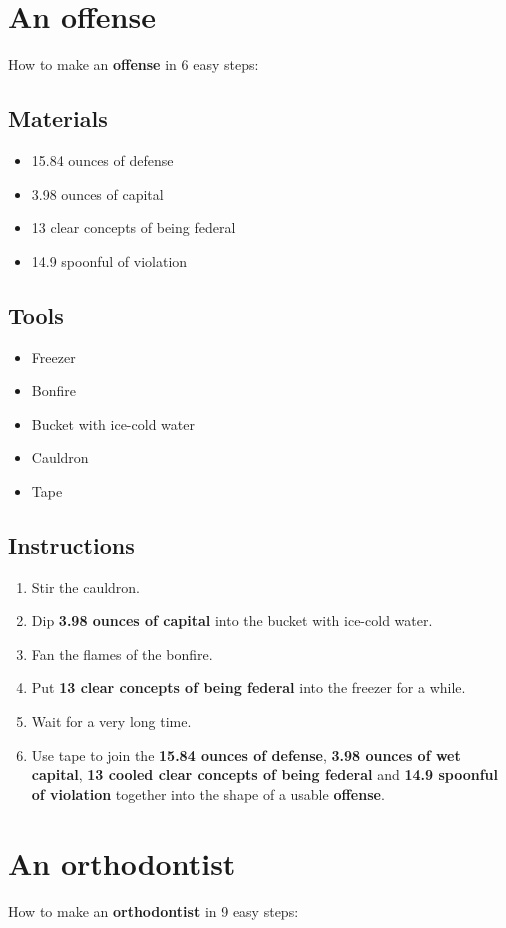 \documentclass{article}
\begin{document}
\section{An offense}How to make an \textbf{offense} in 6 easy steps:

\subsection{Materials}\begin{itemize}
\item 
15.84 ounces of defense
\item 
3.98 ounces of capital
\item 
13 clear concepts of being federal
\item 
14.9 spoonful of violation
\end{itemize}
\subsection{Tools}\begin{itemize}
\item 
Freezer
\item 
Bonfire
\item 
Bucket with ice-cold water
\item 
Cauldron
\item 
Tape
\end{itemize}
\subsection{Instructions}\begin{enumerate}
\item 
Stir the cauldron.
\item 
Dip \textbf{3.98 ounces of capital} into the bucket with ice-cold water.
\item 
Fan the flames of the bonfire.
\item 
Put \textbf{13 clear concepts of being federal} into the freezer for a while.
\item 
Wait for a very long time.
\item 
Use tape to join the \textbf{15.84 ounces of defense}, \textbf{3.98 ounces of wet capital}, \textbf{13 cooled clear concepts of being federal} and \textbf{14.9 spoonful of violation} together into the shape of a usable \textbf{offense}.
\end{enumerate}
\newpage
\section{An orthodontist}How to make an \textbf{orthodontist} in 9 easy steps:
\end{document}
